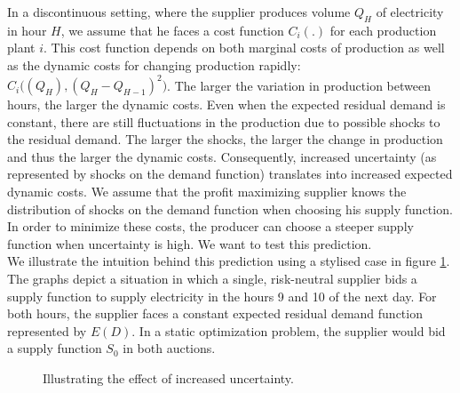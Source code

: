 In a discontinuous setting, where the supplier produces volume $Q_H$ of electricity in hour $H$, we assume that he faces a cost function $C_i(.)$ for each production plant $i$. This cost function depends on both marginal costs of production as well as the dynamic costs for changing production rapidly: $C_i \bigl( (Q_H), (Q_H - Q_{H-1})^2 \bigr)$. The larger the variation in production between hours, the larger the dynamic costs. 
Even when the expected residual demand is constant, there are still fluctuations in the production due to possible shocks to the residual demand. The larger the shocks, the larger the change in production and thus the larger the dynamic costs. Consequently, increased uncertainty (as represented by shocks on the demand function) translates into increased expected dynamic costs. We assume that the profit maximizing supplier knows the distribution of shocks on the demand function when choosing his supply function. In order to minimize these costs, the producer can choose a steeper supply function when uncertainty is high. We want to test this prediction. \\

We illustrate the intuition behind this prediction using a stylised case in figure \ref{predictslope}. The graphs depict a situation in which a single, risk-neutral supplier bids a supply function to supply electricity in the hours 9 and 10 of the next day. For both hours, the supplier faces a constant expected residual demand function represented by $E(D)$. In a static optimization problem, the supplier would bid a supply function $S_0$ in both auctions. \\

\begin{figure}[!ht]
\begin{center}  \end{center}
\caption{Illustrating the effect of increased uncertainty.}
\label{predictslope}
\end{figure}

